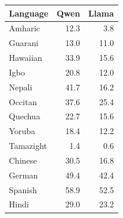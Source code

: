 \begin{tabular}{lrr}
\toprule
Language & Qwen & Llama \\
\midrule
Amharic & 12.3 & 3.8 \\
Guarani & 13.0 & 11.0 \\
Hawaiian & 33.9 & 15.6 \\
Igbo & 20.8 & 12.0 \\
Nepali & 41.7 & 16.2 \\
Occitan & 37.6 & 25.4 \\
Quechua & 22.7 & 15.6 \\
Yoruba & 18.4 & 12.2 \\
Tamazight & 1.4 & 0.6 \\
\midrule
Chinese & 30.5 & 16.8 \\
German & 49.4 & 42.4 \\
Spanish & 58.9 & 52.5 \\
Hindi & 29.0 & 23.2 \\
\bottomrule
\end{tabular}
